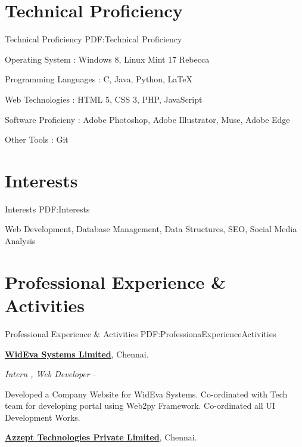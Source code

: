 \documentclass[letterpaper,MMMyyyy,nonstop]{simpleresumecv}
\begin{document}
\begin{body}

\section
{Technical Proficiency}
{Technical Proficiency}
{PDF:Technical Proficiency}

\BulletItem
Operating System : Windows 8, Linux Mint 17 Rebecca 

\BulletItem
Programming Languages : C, Java, Python, {\LaTeX} 

\BulletItem
Web Technologies : HTML 5, CSS 3, PHP, JavaScript 

\BulletItem
Software Proficieny : Adobe Photoshop, Adobe Illustrator, Muse, Adobe Edge 

\BulletItem
Other Tools : Git


\section
{Interests}
{Interests}
{PDF:Interests}

Web Development,
Database Management,
Data Structures,
SEO,
Social Media Analysis



\section
{Professional Experience\newline
\& Activities}
{Professional Experience \& Activities}
{PDF:ProfessionaExperienceActivities}

\href{http://www.wideva.com}
{\textbf{WidEva Systems Limited}},
Chennai.

\GapNoBreak
\BulletItem
\emph{Intern , Web Developer}
\hfill
{} -- 

\begin{detail}
\SubBulletItem
Developed a Company Website for WidEva Systems.
\SubBulletItem
Co-ordinated with Tech team for developing portal  using Web2py Framework.
\SubBulletItem
Co-ordinated all UI Development Works.
\end{detail}

\BigGap
\href{http://www.azzept.com}
{\textbf{Azzept Technologies Private Limited}},
Chennai.


\end{body}
\end{document}

